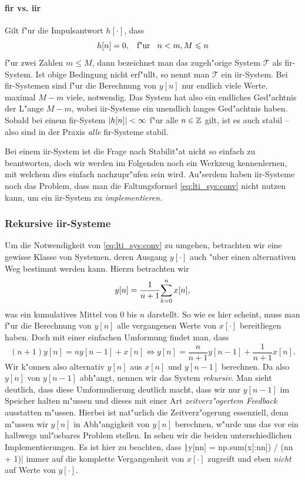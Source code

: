 \paragraph{\texorpdfstring{\acrshort*{fir}}{FIR} vs. \texorpdfstring{\acrshort*{iir}}{IIR}}
%
Gilt f"ur die Impulsantwort $h[\cdot]$, dass
\[
h[n] = 0, {\hspace{3mm} \text{f"ur} \hspace{3mm}} n < m, M \leqslant n
\]
f"ur zwei Zahlen $m \leqslant M$, dann bezeichnet man das zugeh"orige System $\mathcal{T}$ als \gls{fir}-System.
Ist obige Bedingung nicht erf"ullt, so nennt man $\mathcal{T}$ ein \gls{iir}-System.
Bei \gls{fir}-Systemen sind f"ur die Berechnung von $y[n]$ nur endlich viele Werte, maximal $M - m$ viele, notwendig.
Das System hat also ein endliches Ged"achtnis der L"ange $M - m$, wobei \gls{iir}-Systeme ein unendlich langes Ged"achtnis haben.
Sobald bei einem \gls{fir}-System ${\left| h[n] \right|} < \infty$ f"ur alle $n \in \mathbb{Z}$ gilt, ist es auch stabil -- also sind in der Praxis \emph{alle} \gls{fir}-Systeme stabil.

Bei einem \gls{iir}-System ist die Frage nach Stabilit"at nicht so einfach zu beantworten, doch wir werden im Folgenden noch ein Werkzeug kennenlernen, mit welchem dies einfach nachzupr"ufen sein wird.
Au"serdem haben \gls{iir}-Systeme noch das Problem, dass man die Faltungsformel \eqref{eq:lti_sys:conv} nicht nutzen kann, um ein \gls{iir}-System zu \emph{implementieren}.
%
%
\subsubsection{Rekursive \texorpdfstring{\acrshort*{iir}}{IIR}-Systeme}
%
%
Um die Notwendigkeit von \eqref{eq:lti_sys:conv} zu umgehen, betrachten wir eine gewisse Klasse von Systemen, deren Ausgang $y[\cdot]$ auch "uber einen alternativen Weg bestimmt werden kann.
Hierzu betrachten wir
\[
y[n] = \frac{1}{n+1}{\sum\limits_{k=0}^{n}{x[n]}},
\]
was ein kumulatives Mittel von $0$ bis $n$ darstellt.
So wie es hier scheint, muss man f"ur die Berechnung von $y[n]$ alle vergangenen Werte von $x[\cdot]$ bereitliegen haben.
Doch mit einer einfachen Umformung findet man, dass
\[
(n+1)y[n] = n y[n-1] + x[n] 
\Leftrightarrow 
y[n] = \frac{n}{n+1} y[n-1] + \frac{1}{n+1} x[n].
\]
Wir k"onnen also alternativ $y[n]$ aus $x[n]$ und $y[n-1]$ berechnen.
Da also $y[n]$ von $y[n-1]$ abh"angt, nennen wir das System \emph{rekursiv}.
Man sieht deutlich, dass diese Umformulierung deutlich macht, dass wir nur $y[n-1]$ im Speicher halten m"ussen und dieses mit einer Art \emph{zeitverz"ogertem Feedback} ausstatten m"ussen.
Hierbei ist nat"urlich die Zeitverz"ogerung essenziell, denn m"ussen wir $y[n]$ in Abh"angigkeit von $y[n]$ berechnen, w"urde uns das vor ein halbwegs unl"osbares Problem stellen.
In  sehen wir die beiden unterschiedlichen Implementierungen.
Es ist hier zu beachten, dass \texttt|y[nn] = np.sum(x[:nn]) / (nn + 1)| immer auf die komplette Vergangenheit von $x[\cdot]$ zugreift und eben \emph{nicht} auf Werte von $y[\cdot]$.

